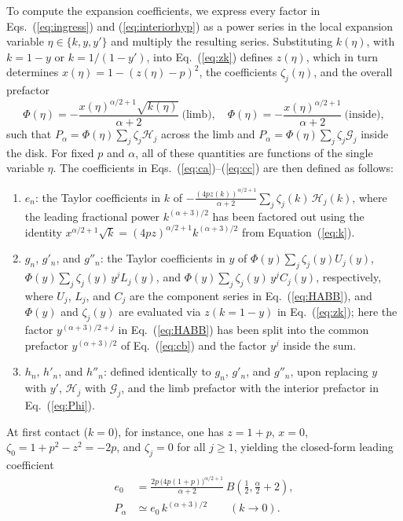 \documentclass[11pt]{article}
\begin{document}
To compute the expansion coefficients, we express every factor in Eqs.~(\ref{eq:ingress}) and (\ref{eq:interiorhyp}) as a power series in the local expansion variable $\eta\in\{k, y, y'\}$ and multiply the resulting series. Substituting $k(\eta)$, with $k=1-y$ or $k=1/(1-y')$, into Eq.~(\ref{eq:zk}) defines $z(\eta)$, which in turn determines $x(\eta)=1-(z(\eta)-p)^2$, the coefficients $\zeta_j(\eta)$, and the overall prefactor
\begin{equation}
\Phi(\eta)=-\frac{x(\eta)^{\alpha/2+1}\sqrt{k(\eta)}}{\alpha+2}\ \text{(limb)},\quad \Phi(\eta)=-\frac{x(\eta)^{\alpha/2+1}}{\alpha+2}\ \text{(inside)}, \label{eq:Phi}
\end{equation}
such that $P_\alpha=\Phi(\eta)\sum_j\zeta_j\mathcal H_j$ across the limb and $P_\alpha=\Phi(\eta)\sum_j\zeta_j\mathcal G_j$ inside the disk. For fixed $p$ and $\alpha$, all of these quantities are functions of the single variable $\eta$. The coefficients in Eqs.~(\ref{eq:ca})--(\ref{eq:cc}) are then defined as follows:
\begin{enumerate}
\item $e_n$: the Taylor coefficients in $k$ of $-\frac{(4pz(k))^{\alpha/2+1}}{\alpha+2}\sum_j\zeta_j(k)\,\mathcal H_j(k)$, where the leading fractional power $k^{(\alpha+3)/2}$ has been factored out using the identity $x^{\alpha/2+1}\sqrt k=(4pz)^{\alpha/2+1}k^{(\alpha+3)/2}$ from Equation~(\ref{eq:k}).
\item $g_n$, $g'_n$, and $g''_n$: the Taylor coefficients in $y$ of $\Phi(y)\sum_j\zeta_j(y)U_j(y)$, $\Phi(y)\sum_j\zeta_j(y)\,y^jL_j(y)$, and $\Phi(y)\sum_j\zeta_j(y)\,y^jC_j(y)$, respectively, where $U_j$, $L_j$, and $C_j$ are the component series in Eq.~(\ref{eq:HABB}), and $\Phi(y)$ and $\zeta_j(y)$ are evaluated via $z(k=1-y)$ in Eq.~(\ref{eq:zk}); here the factor $y^{(\alpha+3)/2+j}$ in Eq.~(\ref{eq:HABB}) has been split into the common prefactor $y^{(\alpha+3)/2}$ of Eq.~(\ref{eq:cb}) and the factor $y^j$ inside the sum.
\item $h_n$, $h'_n$, and $h''_n$: defined identically to $g_n$, $g'_n$, and $g''_n$, upon replacing $y$ with $y'$, $\mathcal H_j$ with $\mathcal G_j$, and the limb prefactor with the interior prefactor in Eq.~(\ref{eq:Phi}).
\end{enumerate}
At first contact ($k=0$), for instance, one has $z=1+p$, $x=0$, $\zeta_0=1+p^2-z^2=-2p$, and $\zeta_j=0$ for all $j\ge1$, yielding the closed-form leading coefficient
\begin{equation}
\begin{aligned}
e_0&=\frac{2p\,\bigl(4p(1+p)\bigr)^{\alpha/2+1}}{\alpha+2}\,B\!\left(\tfrac12,\tfrac{\alpha}{2}+2\right),\\
P_\alpha&\simeq e_0\,k^{(\alpha+3)/2}\qquad(k\to0).
\end{aligned} \label{eq:a0}
\end{equation}
\end{document}
